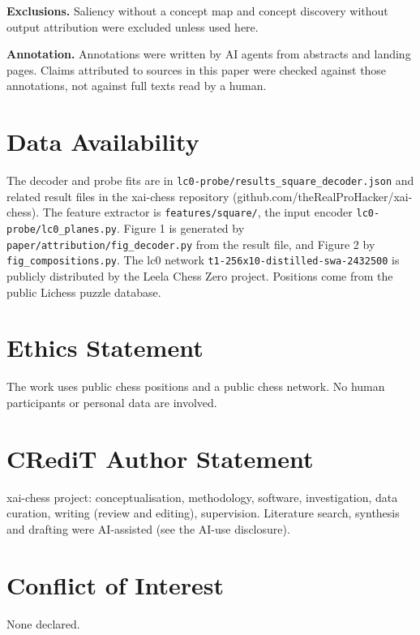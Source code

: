 \documentclass[conference]{IEEEtran}
\begin{document}
\textbf{Exclusions.} Saliency without a concept map and concept discovery without output attribution were excluded unless used here.

\textbf{Annotation.} Annotations were written by AI agents from abstracts and landing pages. Claims attributed to sources in this paper were checked against those annotations, not against full texts read by a human.

\section*{Data Availability}
The decoder and probe fits are in \texttt{lc0-\allowbreak{}probe/\allowbreak{}results\_\allowbreak{}square\_\allowbreak{}decoder.\allowbreak{}json} and related result files in the xai-chess repository (github.com/\allowbreak{}theRealProHacker/\allowbreak{}xai-chess). The feature extractor is \texttt{features/\allowbreak{}square/\allowbreak{}}, the input encoder \texttt{lc0-\allowbreak{}probe/\allowbreak{}lc0\_\allowbreak{}planes.\allowbreak{}py}. Figure 1 is generated by \texttt{paper/\allowbreak{}attribution/\allowbreak{}fig\_\allowbreak{}decoder.\allowbreak{}py} from the result file, and Figure 2 by \texttt{fig\_\allowbreak{}compositions.\allowbreak{}py}. The lc0 network \texttt{t1-\allowbreak{}256x10-\allowbreak{}distilled-\allowbreak{}swa-\allowbreak{}2432500} is publicly distributed by the Leela Chess Zero project. Positions come from the public Lichess puzzle database.

\section*{Ethics Statement}
The work uses public chess positions and a public chess network. No human participants or personal data are involved.

\section*{CRediT Author Statement}
xai-chess project: conceptualisation, methodology, software, investigation, data curation, writing (review and editing), supervision. Literature search, synthesis and drafting were AI-assisted (see the AI-use disclosure).

\section*{Conflict of Interest}
None declared.
\end{document}

